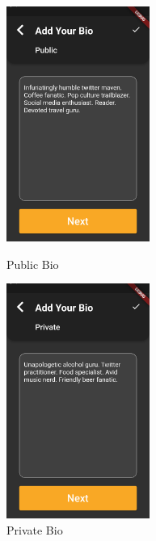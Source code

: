 \documentclass{article}
\begin{document}
\begin{figure}[!htb]
	\centering
	\begin{minipage}{.45\textwidth}
		\centering
		\includegraphics[height=7.7cm,keepaspectratio]{assets/images/ui/signup/14-public-bio-selected.png}
		\caption{Public Bio}
	\end{minipage}\quad
	\begin{minipage}{.45\textwidth}
		\centering
		\includegraphics[height=7.7cm,keepaspectratio]{assets/images/ui/signup/16-private-bio-selected.png}
		\caption{Private Bio}
	\end{minipage}
\end{figure}
\end{document}
